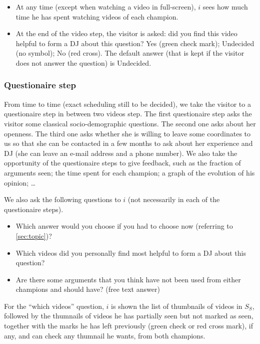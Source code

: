 \documentclass[version=3.21, pagesize, twoside=off, bibliography=totoc, DIV=calc, fontsize=12pt, a4paper]{scrartcl}
\begin{document}
\begin{itemize}
	\item At any time (except when watching a video in full-screen), $i$ sees how much time he has spent watching videos of each champion.
	\item At the end of the video step, the visitor is asked: did you find this video helpful to form a \ac{DJ} about this question? Yes (green check mark); Undecided (no symbol); No (red cross). The default answer (that is kept if the visitor does not answer the question) is Undecided.
\end{itemize}

\subsubsection{Questionaire step}
From time to time (exact scheduling still to be decided), we take the visitor to a questionaire step in between two videos step. The first questionaire step asks the visitor some classical socio-demographic questions. The second one asks about her openness. The third one asks whether she is willing to leave some coordinates to us so that she can be contacted in a few months to ask about her experience and \ac{DJ} (she can leave an e-mail address and a phone number). We also take the opportunity of the questionaire steps to give feedback, such as the fraction of arguments seen; the time spent for each champion; a graph of the evolution of his opinion; … 

We also ask the following questions to $i$ (not necessarily in each of the questionaire steps).
\begin{itemize}
	\item Which answer would you choose if you had to choose now (referring to \cref{sec:topic})?
	\item Which videos did you personally find most helpful to form a \ac{DJ} about this question?
	\item Are there some arguments that you think have not been used from either champions and should have? (free text answer)
\end{itemize}
For the “which videos” question, $i$ is shown the list of thumbnails of videos in $S_S$, followed by the thumnails of videos he has partially seen but not marked as seen, together with the marks he has left previously (green check or red cross mark), if any, and can check any thumnail he wants, from both champions. 
\end{document}
